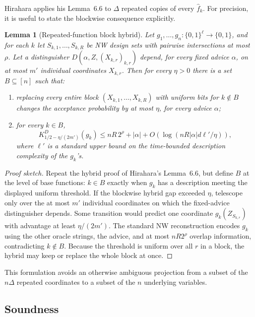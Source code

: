 \documentclass[11pt]{article}
\newtheorem{lemma}[theorem]{Lemma}
\theoremstyle{definition}
\newcommand{\bits}{\{0,1\}}
\begin{document}
Hirahara applies his Lemma~6.6 to $\Delta$ repeated copies of every $\widehat f_k$.  For precision, it is useful to state the blockwise consequence explicitly.

\begin{lemma}[Repeated-function block hybrid]\label{lem:block-hybrid}
Let $g_1,\ldots,g_n:\bits^\ell\to\bits$, and for each $k$ let
$S_{k,1},\ldots,S_{k,R}$ be NW design sets with pairwise intersections at most $\rho$.  Let a distinguisher $D(\alpha,Z,(X_{k,r})_{k,r})$ depend, for every fixed advice $\alpha$, on at most $m'$ individual coordinates $X_{k,r}$.  Then for every $\eta>0$ there is a set $B\subseteq[n]$ such that:

\begin{enumerate}[label=(\roman*)]
\item replacing every entire block $(X_{k,1},\ldots,X_{k,R})$ with uniform bits for $k\notin B$ changes the acceptance probability by at most $\eta$, for every advice $\alpha$;
\item for every $k\in B$,
\[
 K^D_{1/2-\eta/(2m')}(g_k)
 \le nR\,2^\rho+|\alpha|+O(\log(nR|\alpha|d\ell'/\eta)),
\]
where $\ell'$ is a standard upper bound on the time-bounded description complexity of the $g_k$'s.
\end{enumerate}
\end{lemma}

\begin{proof}[Proof sketch]
Repeat the hybrid proof of Hirahara's Lemma~6.6, but define $B$ at the level of base functions: $k\in B$ exactly when $g_k$ has a description meeting the displayed uniform threshold.  If the blockwise hybrid gap exceeded $\eta$, telescope only over the at most $m'$ individual coordinates on which the fixed-advice distinguisher depends.  Some transition would predict one coordinate $g_k(Z_{S_{k,r}})$ with advantage at least $\eta/(2m')$.  The standard NW reconstruction encodes $g_k$ using the other oracle strings, the advice, and at most
$nR2^\rho$ overlap information, contradicting $k\notin B$.  Because the threshold is uniform over all $r$ in a block, the hybrid may keep or replace the whole block at once.
\end{proof}

This formulation avoids an otherwise ambiguous projection from a subset of the $n\Delta$ repeated coordinates to a subset of the $n$ underlying variables.

\subsection{Soundness}
\end{document}
